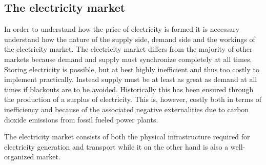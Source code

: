 \label{sec:theory}

\subsection{The electricity market}
\label{subsec:t_market}
In order to understand how the price of electricity is formed it is necessary understand how the nature of the supply side, demand side and the workings of the electricity market. The electricity market differs from the majority of other markets because demand and supply must synchronize completely at all times. Storing electricity is possible, but at best highly inefficient and thus too costly to implement practically. Instead supply must be at least as great as demand at all times if blackouts are to be avoided. Historically this has been ensured through the production of a surplus of electricity. This is, however, costly both in terms of inefficiency and because of the associated negative externalities due to carbon dioxide emissions from fossil fueled power plants.\par

The electricity market consists of both the physical infrastructure required for electricity generation and transport while it on the other hand is also a well-organized market.
\par

